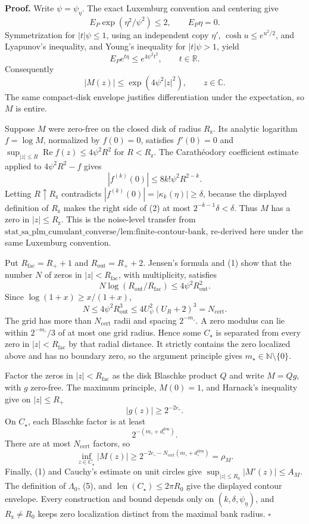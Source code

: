 \textbf{Proof.}
Write \(\psi=\psi_\eta\).  The exact Luxemburg convention and centering give
\[
 E_P\exp(\eta^2/\psi^2)\le2,
 \qquad E_P\eta=0.
\]
Symmetrization for \(|t|\psi\le1\), using an independent copy \(\eta'\), \(\cosh u\le e^{u^2/2}\), and Lyapunov's inequality, and Young's inequality for \(|t|\psi>1\), yield
\[
 E_Pe^{t\eta}\le e^{4\psi^2t^2},\qquad t\in\mathbb R.
\]
Consequently
\[
 |M(z)|\le\exp(4\psi^2|z|^2),\qquad z\in\mathbb C. \tag{1}
\]
The same compact-disk envelope justifies differentiation under the expectation, so \(M\) is entire.

Suppose \(M\) were zero-free on the closed disk of radius \(R_{\mathrm z}\).  Its analytic logarithm \(f=\log M\), normalized by \(f(0)=0\), satisfies \(f'(0)=0\) and \(\sup_{|z|\le R}\operatorname{Re}f(z)\le4\psi^2R^2\) for \(R<R_{\mathrm z}\).  The Carath\'eodory coefficient estimate applied to \(4\psi^2R^2-f\) gives
\[
 |f^{(k)}(0)|\le8k!\psi^2R^{2-k}. \tag{2}
\]
Letting \(R\uparrow R_{\mathrm z}\) contradicts \(|f^{(k)}(0)|=|\kappa_k(\eta)|\ge\delta\), because the displayed definition of \(R_{\mathrm z}\) makes the right side of (2) at most \(2^{-k-1}\delta<\delta\).  Thus \(M\) has a zero in \(|z|\le R_{\mathrm z}\).  This is the noise-level transfer from \(\text{stat\_sa\_plm\_cumulant\_converse/lem:finite-contour-bank}\), re-derived here under the same Luxemburg convention.

Put \(R_{\mathrm{fac}}=R_++1\) and \(R_{\mathrm{out}}=R_++2\).  Jensen's formula and (1) show that the number \(N\) of zeros in \(|z|<R_{\mathrm{fac}}\), with multiplicity, satisfies
\[
 N\log(R_{\mathrm{out}}/R_{\mathrm{fac}})
 \le4\psi^2R_{\mathrm{out}}^2.
\]
Since \(\log(1+x)\ge x/(1+x)\),
\[
 N\le4\psi^2R_{\mathrm{out}}^3
 \le4U_\psi^2(U_R+2)^3=N_{\mathrm{cert}}. \tag{3}
\]
The grid has more than \(N_{\mathrm{cert}}\) radii and spacing \(2^{-m_\circ}\).  A zero modulus can lie within \(2^{-m_\circ}/3\) of at most one grid radius.  Hence some \(C_\star\) is separated from every zero in \(|z|<R_{\mathrm{fac}}\) by that radial distance.  It strictly contains the zero localized above and has no boundary zero, so the argument principle gives \(m_\star\in\mathbb N\setminus\{0\}\).

Factor the zeros in \(|z|<R_{\mathrm{fac}}\) as the disk Blaschke product \(Q\) and write \(M=Qg\), with \(g\) zero-free.  The maximum principle, \(M(0)=1\), and Harnack's inequality give on \(|z|\le R_+\)
\[
 |g(z)|\ge2^{-2e_\circ}. \tag{4}
\]
On \(C_\star\), each Blaschke factor is at least
\[
 2^{-(m_\circ+d_\circ^{\mathrm{den}})}.
\]
There are at most \(N_{\mathrm{cert}}\) factors, so
\[
 \inf_{z\in C_\star}|M(z)|
 \ge2^{-2e_\circ-N_{\mathrm{cert}}(m_\circ+d_\circ^{\mathrm{den}})}
 =\rho_M. \tag{5}
\]
Finally, (1) and Cauchy's estimate on unit circles give \(\sup_{|z|\le R_0}|M'(z)|\le A_M\).  The definition of \(\Lambda_0\), (5), and \(\operatorname{len}(C_\star)\le2\pi R_0\) give the displayed contour envelope.  Every construction and bound depends only on \((k,\delta,\psi_\eta)\), and \(R_{\mathrm z}\ne R_0\) keeps zero localization distinct from the maximal bank radius. \(\square\)
